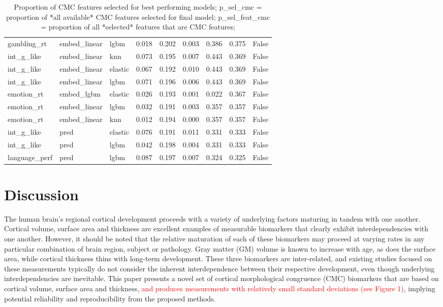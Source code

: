 \documentclass{article}
\begin{document}
\begin{table}
\begin{tabular}{lllrrrrrr}
	gambling\_rt & embed\_linear & lgbm & 0.018 & 0.202 & 0.003 & 0.386 & 0.375 & False \\
	int\_g\_like & embed\_linear & knn & 0.073 & 0.195 & 0.007 & 0.443 & 0.369 & False \\
	int\_g\_like & embed\_linear & elastic & 0.067 & 0.192 & 0.010 & 0.443 & 0.369 & False \\
	int\_g\_like & embed\_linear & lgbm & 0.071 & 0.196 & 0.006 & 0.443 & 0.369 & False \\
	emotion\_rt & embed\_lgbm & elastic & 0.026 & 0.193 & 0.001 & 0.022 & 0.367 & False \\
	emotion\_rt & embed\_linear & lgbm & 0.032 & 0.191 & 0.003 & 0.357 & 0.357 & False \\
	emotion\_rt & embed\_linear & knn & 0.012 & 0.194 & 0.000 & 0.357 & 0.357 & False \\
	int\_g\_like & pred & elastic & 0.076 & 0.191 & 0.011 & 0.331 & 0.333 & False \\
	int\_g\_like & pred & lgbm & 0.042 & 0.198 & 0.004 & 0.331 & 0.333 & False \\
	language\_perf & pred & lgbm & 0.087 & 0.197 & 0.007 & 0.324 & 0.325 & False \\
	\bottomrule
\end{tabular}
\footnotesize
\caption{Proportion of CMC features selected for best performing models;
p\_sel\_cmc = proportion of *all available* CMC features selected for final model;
p\_sel\_feat\_cmc = proportion of all *selected* features that are CMC features;
}
\normalsize
\label{tab:cmc-feature-select}
\end{table}


\section{Discussion}

The human brain's regional cortical development proceeds with a variety of
underlying factors maturing in tandem with one another. Cortical volume,
surface area and thickness are excellent examples of measurable biomarkers
that clearly exhibit interdependencies with one another. However, it should
be noted that the relative maturation of each of these biomarkers may proceed
at varying rates in any particular combination of brain region, subject or
pathology. Gray matter (GM) volume is known to increase with age, as does the
surface area, while cortical thickness thins with long-term development.
These three biomarkers are inter-related, and existing studies focused on
these measurements typically do not consider the inherent interdependence
between their respective development, even though underlying
interdependencies are inevitable. This paper presents a novel set of cortical
morphological congruence (CMC) biomarkers that are based on cortical volume,
surface area and thickness, \textcolor{red}{and produces measurements with
relatively small standard deviations (see Figure 1)}, implying potential
reliability and reproducibility from the proposed methods.
\end{document}
